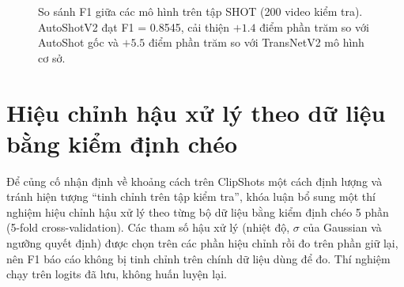 \begin{figure}[H]
\centering
{}
\caption[So sánh F1 trên tập SHOT]{So sánh F1 giữa các mô hình trên tập SHOT (200 video kiểm tra). AutoShotV2 đạt F1 = 0.8545, cải thiện $+1.4$ điểm phần trăm so với AutoShot gốc và $+5.5$ điểm phần trăm so với TransNetV2 mô hình cơ sở.}
\label{fig:f1_comparison}
\end{figure}
\FloatBarrier

\section{Hiệu chỉnh hậu xử lý theo dữ liệu bằng kiểm định chéo}
\label{sec:calibration}

Để củng cố nhận định về khoảng cách trên ClipShots một cách định lượng và tránh hiện tượng ``tinh chỉnh trên tập kiểm tra'', khóa luận bổ sung một thí nghiệm hiệu chỉnh hậu xử lý theo từng bộ dữ liệu bằng kiểm định chéo 5 phần (5-fold cross-validation). Các tham số hậu xử lý (nhiệt độ, $\sigma$ của Gaussian và ngưỡng quyết định) được chọn trên các phần hiệu chỉnh rồi đo trên phần giữ lại, nên F1 báo cáo không bị tinh chỉnh trên chính dữ liệu dùng để đo. Thí nghiệm chạy trên logits đã lưu, không huấn luyện lại.

